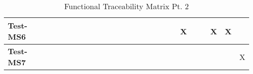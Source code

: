 \documentclass[12pt, titlepage]{article}
\begin{document}
\begin{landscape}
\begin{table}[H]
\begin{adjustwidth}{-0.1in}{-1in}
{\begin{tabular}{|c|c|c|c|c|c|c|c|c|c|c|c|c|c|c|c|c|c|c|c|c|c|c|c|}
\multicolumn{1}{|l|}{\textbf{Test-MS6}}   &             &              &             &              &             &             &             &             &              &              &             &             &              &             &              &                & &X & & &X &X &\\ \hline
\multicolumn{1}{|l|}{\textbf{Test-MS7}}   &             &              &             &              &             &             &             &             &              &              &             &             &              &             &              &                & & & & & & &X\\ \hline

\end{tabular}
}
\caption{Functional Traceability Matrix Pt. 2}
    \label{tab:matrix2}
\end{adjustwidth}
\end{table}


\end{landscape}
\end{document}
